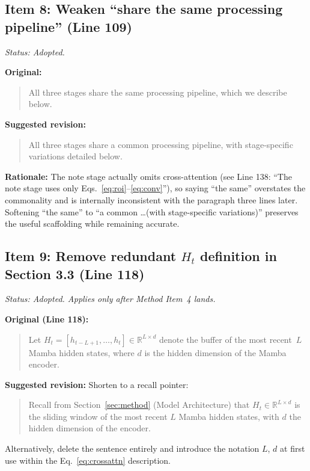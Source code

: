 \documentclass{article}
\begin{document}
\subsection*{Item 8: Weaken ``share the same processing pipeline'' (Line 109)}

\textit{Status: Adopted.}

\textbf{Original:}
\begin{quote}
All three stages share the same processing pipeline, which we describe below.
\end{quote}

\textbf{Suggested revision:}
\begin{quote}
All three stages share a common processing pipeline, with stage-specific variations detailed below.
\end{quote}

\textbf{Rationale:}
The note stage actually omits cross-attention (see Line 138: ``The note stage uses only Eqs.~\ref{eq:roi}--\ref{eq:conv}''), so saying ``the same'' overstates the commonality and is internally inconsistent with the paragraph three lines later. Softening ``the same'' to ``a common \ldots (with stage-specific variations)'' preserves the useful scaffolding while remaining accurate.

\subsection*{Item 9: Remove redundant $H_t$ definition in Section 3.3 (Line 118)}

\textit{Status: Adopted. Applies only after Method Item~4 lands.}

\textbf{Original (Line 118):}
\begin{quote}
Let $H_t = [h_{t-L+1}, \ldots, h_t] \in \mathbb{R}^{L \times d}$ denote the buffer of the most recent~$L$ Mamba hidden states, where $d$ is the hidden dimension of the Mamba encoder.
\end{quote}

\textbf{Suggested revision:}
Shorten to a recall pointer:
\begin{quote}
Recall from Section~\ref{sec:method} (Model Architecture) that $H_t \in \mathbb{R}^{L \times d}$ is the sliding window of the most recent $L$ Mamba hidden states, with $d$ the hidden dimension of the encoder.
\end{quote}
Alternatively, delete the sentence entirely and introduce the notation $L$, $d$ at first use within the Eq.~\ref{eq:crossattn} description.
\end{document}
